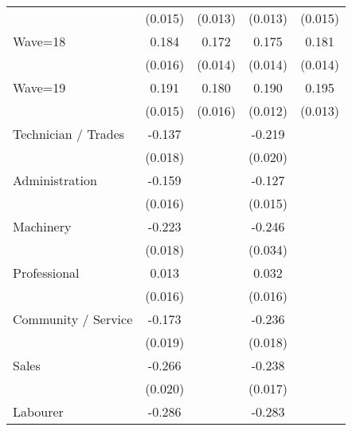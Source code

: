 {\begin{tabular}{l*{4}{c}}
                    &     (0.015)         &     (0.013)         &     (0.013)         &     (0.015)         \\
Wave=18             &       0.184\sym{***}&       0.172\sym{***}&       0.175\sym{***}&       0.181\sym{***}\\
                    &     (0.016)         &     (0.014)         &     (0.014)         &     (0.014)         \\
Wave=19             &       0.191\sym{***}&       0.180\sym{***}&       0.190\sym{***}&       0.195\sym{***}\\
                    &     (0.015)         &     (0.016)         &     (0.012)         &     (0.013)         \\
Technician / Trades &      -0.137\sym{***}&                     &      -0.219\sym{***}&                     \\
                    &     (0.018)         &                     &     (0.020)         &                     \\
Administration      &      -0.159\sym{***}&                     &      -0.127\sym{***}&                     \\
                    &     (0.016)         &                     &     (0.015)         &                     \\
Machinery           &      -0.223\sym{***}&                     &      -0.246\sym{***}&                     \\
                    &     (0.018)         &                     &     (0.034)         &                     \\
Professional        &       0.013         &                     &       0.032\sym{**} &                     \\
                    &     (0.016)         &                     &     (0.016)         &                     \\
Community / Service &      -0.173\sym{***}&                     &      -0.236\sym{***}&                     \\
                    &     (0.019)         &                     &     (0.018)         &                     \\
Sales               &      -0.266\sym{***}&                     &      -0.238\sym{***}&                     \\
                    &     (0.020)         &                     &     (0.017)         &                     \\
Labourer            &      -0.286\sym{***}&                     &      -0.283\sym{***}&                     \\

\end{tabular}}
